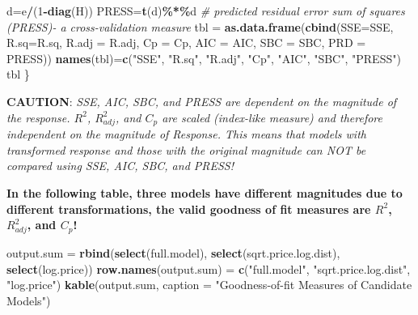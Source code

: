 \documentclass[
]{book}
\newenvironment{Shaded}{\begin{snugshade}}{\end{snugshade}}
\newcommand{\AttributeTok}[1]{\textcolor[rgb]{0.13,0.29,0.53}{#1}}
\newcommand{\CommentTok}[1]{\textcolor[rgb]{0.56,0.35,0.01}{\textit{#1}}}
\newcommand{\DecValTok}[1]{\textcolor[rgb]{0.00,0.00,0.81}{#1}}
\newcommand{\FunctionTok}[1]{\textcolor[rgb]{0.13,0.29,0.53}{\textbf{#1}}}
\newcommand{\NormalTok}[1]{#1}
\newcommand{\OtherTok}[1]{\textcolor[rgb]{0.56,0.35,0.01}{#1}}
\newcommand{\SpecialCharTok}[1]{\textcolor[rgb]{0.81,0.36,0.00}{\textbf{#1}}}
\newcommand{\StringTok}[1]{\textcolor[rgb]{0.31,0.60,0.02}{#1}}
\begin{document}
\begin{Shaded}
\begin{Highlighting}[]
\NormalTok{ d}\OtherTok{=}\NormalTok{e}\SpecialCharTok{/}\NormalTok{(}\DecValTok{1}\SpecialCharTok{{-}}\FunctionTok{diag}\NormalTok{(H))                       }
\NormalTok{ PRESS}\OtherTok{=}\FunctionTok{t}\NormalTok{(d)}\SpecialCharTok{\%*\%}\NormalTok{d   }\CommentTok{\# predicted residual error sum of squares (PRESS){-} a cross{-}validation measure}
\NormalTok{ tbl }\OtherTok{=} \FunctionTok{as.data.frame}\NormalTok{(}\FunctionTok{cbind}\NormalTok{(}\AttributeTok{SSE=}\NormalTok{SSE, }\AttributeTok{R.sq=}\NormalTok{R.sq, }\AttributeTok{R.adj =}\NormalTok{ R.adj, }\AttributeTok{Cp =}\NormalTok{ Cp, }\AttributeTok{AIC =}\NormalTok{ AIC, }\AttributeTok{SBC =}\NormalTok{ SBC, }\AttributeTok{PRD =}\NormalTok{ PRESS))}
 \FunctionTok{names}\NormalTok{(tbl)}\OtherTok{=}\FunctionTok{c}\NormalTok{(}\StringTok{"SSE"}\NormalTok{, }\StringTok{"R.sq"}\NormalTok{, }\StringTok{"R.adj"}\NormalTok{, }\StringTok{"Cp"}\NormalTok{, }\StringTok{"AIC"}\NormalTok{, }\StringTok{"SBC"}\NormalTok{, }\StringTok{"PRESS"}\NormalTok{)}
\NormalTok{ tbl}
\NormalTok{ \}}
\end{Highlighting}
\end{Shaded}

\textbf{\color{red}CAUTION}: \emph{\color{red}SSE, AIC, SBC, and PRESS are dependent on the magnitude of the response. \(R^2\), \(R^2_{adj}\), and \(C_p\) are scaled (index-like measure) and therefore independent on the magnitude of Response. This means that models with transformed response and those with the original magnitude can NOT be compared using SSE, AIC, SBC, and PRESS!}

\textbf{\color{blue}In the following table, three models have different magnitudes due to different transformations, the valid goodness of fit measures are \(R^2\), \(R^2_{adj}\), and \(C_p\)!}

\begin{Shaded}
\begin{Highlighting}[]
\NormalTok{output.sum }\OtherTok{=} \FunctionTok{rbind}\NormalTok{(}\FunctionTok{select}\NormalTok{(full.model), }\FunctionTok{select}\NormalTok{(sqrt.price.log.dist), }\FunctionTok{select}\NormalTok{(log.price))}
\FunctionTok{row.names}\NormalTok{(output.sum) }\OtherTok{=} \FunctionTok{c}\NormalTok{(}\StringTok{"full.model"}\NormalTok{, }\StringTok{"sqrt.price.log.dist"}\NormalTok{, }\StringTok{"log.price"}\NormalTok{)}
\FunctionTok{kable}\NormalTok{(output.sum, }\AttributeTok{caption =} \StringTok{"Goodness{-}of{-}fit Measures of Candidate Models"}\NormalTok{)}
\end{Highlighting}
\end{Shaded}
\end{document}
